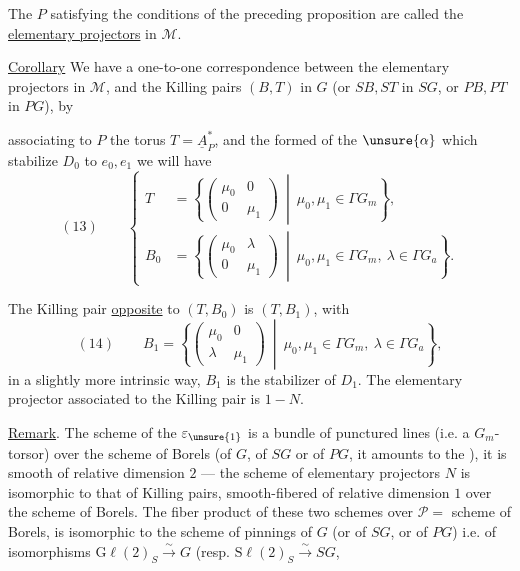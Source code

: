  The $P$  satisfying the conditions of the preceding proposition are called the \uline{elementary projectors} in $\mathcal M$. 

\uline{Corollary} We have a one-to-one correspondence between the elementary projectors in $\mathcal M$, and the Killing pairs $(B,T)$ in $G$ (or $SB,ST$ in $SG$, or $PB,PT$ in $PG$), by



associating to  $P$ the  torus
$T=\underline{A}_P^*$, and the
formed of the $\unsure{\alpha}$ which stabilize
 $D_0$
to $e_0,e_1$ we will have
\[
(13)\qquad
\left\{
\begin{aligned}
T&=\left\{\begin{pmatrix}\mu_0&0\\0&\mu_1\end{pmatrix}
\ \middle|\ \mu_0,\mu_1\in\Gamma G_m\right\},\\
B_0&=\left\{\begin{pmatrix}\mu_0&\lambda\\0&\mu_1\end{pmatrix}
\ \middle|\ \mu_0,\mu_1\in\Gamma G_m,\ \lambda\in\Gamma G_a\right\}.
\end{aligned}
\right.
\]

The Killing pair \uline{opposite} to $(T,B_0)$ is
$(T,B_1)$, with
\[
(14)\qquad
B_1=\left\{\begin{pmatrix}\mu_0&0\\\lambda&\mu_1\end{pmatrix}
\ \middle|\ \mu_0,\mu_1\in\Gamma G_m,\ \lambda\in\Gamma G_a\right\},
\]
in a slightly more intrinsic way, $B_1$
 is the stabilizer of $D_1$.
The elementary projector associated to the Killing pair
 is $1-N$.

\uline{Remark}. The scheme of the $\varepsilon_{\unsure{1}}$
is a bundle of punctured lines (i.e. a $G_m$-torsor)
over the scheme  of Borels
(of $G$, of $SG$ or of $PG$, it amounts to the ),
it is  smooth of relative dimension $2$ — the scheme of
elementary projectors $N$ is  isomorphic
to that of Killing pairs, smooth-fibered of relative dimension $1$
over the scheme of Borels. The  fiber product of
these two  schemes over
$\mathcal P=$ scheme of Borels, is isomorphic to the scheme
of pinnings of $G$ (or of $SG$, or of $PG$)
i.e. of isomorphisms $\mathrm{G}\ell(2)_S\xrightarrow{\sim}G$
(resp. $\mathrm{S}\ell(2)_S\xrightarrow{\sim}SG$,

